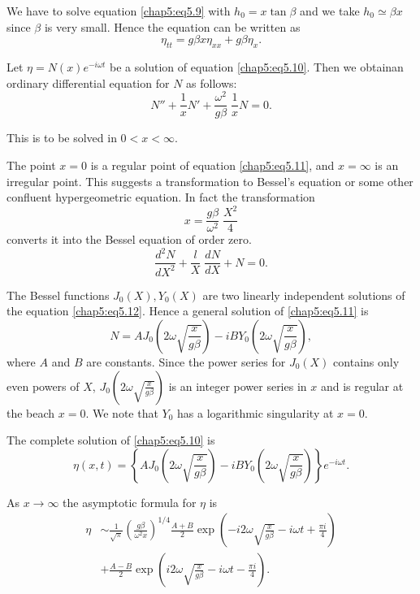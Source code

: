 We have to solve equation \eqref{chap5:eq5.9} with $h_0=x\tan\beta$ and we take $h_0\simeq\beta x$ since $\beta$ is very small. Hence the equation can be written as 
\begin{equation}
\eta_{tt}=g\beta x\eta_{xx}+g\beta\eta_x.\tag{5.10}\label{chap5:eq5.10}
\end{equation}

Let $\eta=N(x)e^{-i\omega t}$ be a solution of equation \eqref{chap5:eq5.10}. Then we obtain\pageoriginale an ordinary differential equation for $N$ as follows:
\begin{equation}
N''+\frac{1}{x}N'+\frac{\omega^2}{g\beta}\;\frac{1}{x}N=0. \tag{5.11}\label{chap5:eq5.11}
\end{equation}

This is to be solved in $0< x <\infty$.

The point $x=0$ is a regular point of equation \eqref{chap5:eq5.11}, and $x=\infty$ is an irregular point. This suggests a transformation to Bessel's equation or some other confluent hypergeometric equation. In fact the transformation 
$$
x=\frac{g\beta}{\omega^2}\;\frac{X^2}{4}
$$
converts it into the Bessel equation of order zero.
\begin{equation}
\frac{d^2N}{dX^2}+\frac{l}{X}\;\frac{dN}{dX}+N=0.\tag{5.12}\label{chap5:eq5.12}
\end{equation}

The Bessel functions $J_0(X), Y_0(X)$ are two linearly independent solutions of the equation \eqref{chap5:eq5.12}. Hence a general solution of \eqref{chap5:eq5.11} is 
$$
N=AJ_0\left(2\omega \sqrt{\frac{x}{g\beta}}\right)-iBY_0\left(2\omega  \sqrt{\frac{x}{g\beta}}\right),
$$
where $A$ and $B$ are constants. Since the power series for $J_0(X)$ contains only even powers of $X$, $J_0 \left(2\omega \sqrt{\frac{x}{g\beta}} \right)$ is an integer power series in $x$ and is regular at the beach $x=0$. We note that $Y_0$ has a logarithmic singularity at $x=0$. 

The complete solution of \eqref{chap5:eq5.10} is 
$$
\eta(x,t)=\left\{AJ_0\left(2\omega \sqrt{\frac{x}{g\beta}}\right)-iBY_0 \left(2\omega \sqrt{\frac{x}{g\beta}}\right)\right\}e^{-i\omega t}.
$$

As $x\to\infty$ the asymptotic formula for $\eta$ is 
\begin{equation}
\begin{aligned}
\eta &\sim\frac{1}{\sqrt{\pi}}\left(\frac{g\beta}{\omega^2 x}\right)^{1/4} \frac{A+B}{2}\exp\left(-i2\omega \sqrt{\frac{x}{g\beta}}-i\omega t+\frac{\pi i}{4}\right)\\
&+ \frac{A-B}{2}\exp\left(i2\omega \sqrt{\frac{x}{g\beta}}-i\omega t-\frac{\pi i}{4}\right).
\end{aligned}\tag{5.13}\label{chap5:eq5.13}
\end{equation}\pageoriginale

